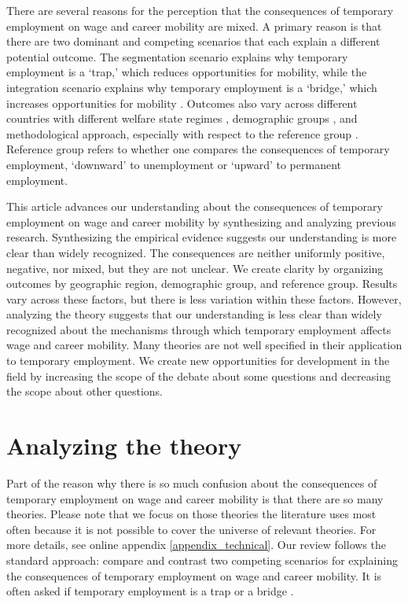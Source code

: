 \documentclass[12pt]{article}
\begin{document}
There are several reasons for the perception that the consequences of temporary employment on wage and career mobility are mixed.  A primary reason is that there are two dominant and competing scenarios that each explain a different potential outcome.  The segmentation scenario explains why temporary employment is a `trap,' which reduces opportunities for mobility, while the integration scenario explains why temporary employment is a `bridge,' which increases opportunities for mobility \citep{giesecke_gross_2003}.  Outcomes also vary across different countries with different welfare state regimes \citep{muffels_luijkx_2008,barbieri_2009}, demographic groups \citep{gebel_2010,fuller_stecy-hildebrandt_2015}, and methodological approach, especially with respect to the reference group \citep{fuller_2011,gebel_2013}.  Reference group refers to whether one compares the consequences of temporary employment, `downward' to unemployment or `upward' to permanent employment.  

This article advances our understanding about the consequences of temporary employment on wage and career mobility by synthesizing and analyzing previous research.  Synthesizing the empirical evidence suggests our understanding is more clear than widely recognized.  The consequences are neither uniformly positive, negative, nor mixed, but they are not unclear.  We create clarity by organizing outcomes by geographic region, demographic group, and reference group.  Results vary across these factors, but there is less variation within these factors.  However, analyzing the theory suggests that our understanding is less clear than widely recognized about the mechanisms through which temporary employment affects wage and career mobility.  Many theories are not well specified in their application to temporary employment.  We create new opportunities for development in the field by increasing the scope of the debate about some questions and decreasing the scope about other questions.  

\section{Analyzing the theory}

Part of the reason why there is so much confusion about the consequences of temporary employment on wage and career mobility is that there are so many theories.  Please note that we focus on those theories the literature uses most often because it is not possible to cover the universe of relevant theories.  For more details, see online appendix \ref{appendix_technical}.  Our review follows the standard approach: compare and contrast two competing scenarios for explaining the consequences of temporary employment on wage and career mobility.  It is often asked if temporary employment is a trap or a bridge \citep{buchtemann_quack_1989,booth_etal_2002,scherer_2004,gash_2008,babos_2014,mcvicar_etal_2019}.
\end{document}
